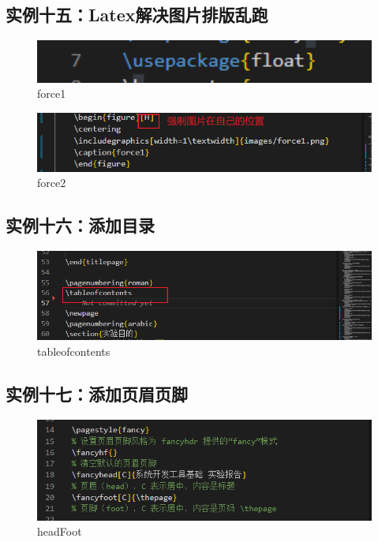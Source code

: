 \documentclass[a4paper]{article}
\begin{document}
\subsection{实例十五：Latex解决图片排版乱跑}
    \begin{figure}[H]
    \centering
    \includegraphics[width=1\textwidth]{images/force1.png}
    \caption{force1}
    \end{figure}
    \begin{figure}[H]
    \centering
    \includegraphics[width=1\textwidth]{images/force2.png}
    \caption{force2}
    \end{figure}

\subsection{实例十六：添加目录}
    \begin{figure}[H]
    \centering
    \includegraphics[width=1\textwidth]{images/tableofcontents.png}
    \caption{tableofcontents}
    \end{figure}
\subsection{实例十七：添加页眉页脚}
    \begin{figure}[H]
    \centering
    \includegraphics[width=1\textwidth]{images/headFoot.png}
    \caption{headFoot}
    \end{figure}
\end{document}
